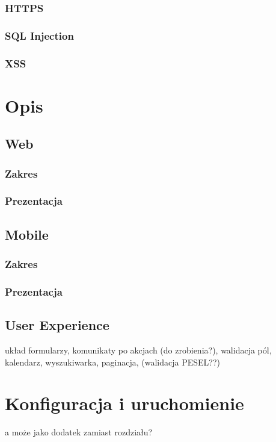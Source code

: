 \documentclass[11pt]{aghdpl}
\begin{document}
\subsection{HTTPS}

\subsection{SQL Injection}

\subsection{XSS}



\chapter{Opis}
\label{cha:opis}

\section{Web}
\subsection{Zakres}
\subsection{Prezentacja}
\section{Mobile}
\subsection{Zakres}
\subsection{Prezentacja}
\section{User Experience}
układ formularzy, komunikaty po akcjach (do zrobienia?), walidacja pól, kalendarz, wyszukiwarka, paginacja, (walidacja PESEL??)

\chapter{Konfiguracja i uruchomienie}
\label{cha:konfiguracja_i_uruchomienie}
a może jako dodatek zamiast rozdziału?
\end{document}
